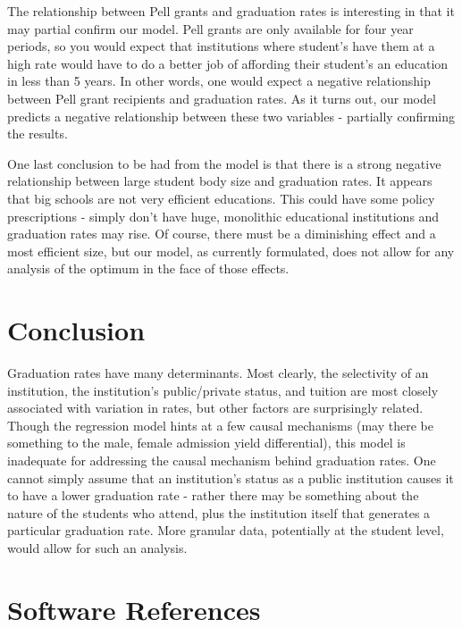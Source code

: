 \documentclass{article}
\begin{document}
The relationship between Pell grants and graduation rates is interesting in that it may partial confirm our model. Pell grants are only available for four year periods, so you would expect that institutions where student's have them at a high rate would have to do a better job of affording their student's an education in less than 5 years. In other words, one would expect a negative relationship between Pell grant recipients and graduation rates. As it turns out, our model predicts a negative relationship between these two variables - partially confirming the results.

One last conclusion to be had from the model is that there is a strong negative relationship between large student body size and graduation rates. It appears that big schools are not very efficient educations. This could have some policy prescriptions - simply don't have huge, monolithic educational institutions and graduation rates may rise. Of course, there must be a diminishing effect and a most efficient size, but our model, as currently formulated, does not allow for any analysis of the optimum in the face of those effects.

\section{Conclusion}

Graduation rates have many determinants. Most clearly, the selectivity of an institution, the institution's public/private status, and tuition are most closely associated with variation in rates, but other factors are surprisingly related. Though the regression model hints at a few causal mechanisms (may there be something to the male, female admission yield differential), this model is inadequate for addressing the causal mechanism behind graduation rates. One cannot simply assume that an institution's status as a public institution causes it to have a lower graduation rate - rather there may be something about the nature of the students who attend, plus the institution itself that generates a particular graduation rate. More granular data, potentially at the student level, would allow for such an analysis.

\section{Software References}
\end{document}
